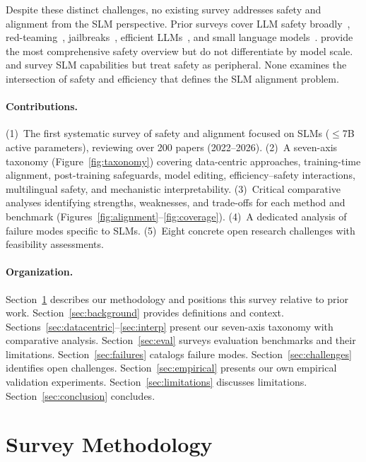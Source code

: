\documentclass[12pt,a4paper]{article}
\begin{document}
Despite these distinct challenges, no existing survey addresses safety and alignment from the SLM perspective. Prior surveys cover LLM safety broadly~\citep{li2024safetysurvey}, red-teaming~\citep{wang2024redteamsurvey}, jailbreaks~\citep{yi2024jailbreaksurvey}, efficient LLMs~\citep{wan2024efficient}, and small language models~\citep{wang2024slmsurvey,lu2024slm}. \citet{li2024safetysurvey} provide the most comprehensive safety overview but do not differentiate by model scale. \citet{wang2024slmsurvey} and \citet{lu2024slm} survey SLM capabilities but treat safety as peripheral. None examines the intersection of safety and efficiency that defines the SLM alignment problem.

\paragraph{Contributions.} (1)~The first systematic survey of safety and alignment focused on SLMs ($\leq$7B active parameters), reviewing over 200 papers (2022--2026). (2)~A seven-axis taxonomy (Figure~\ref{fig:taxonomy}) covering data-centric approaches, training-time alignment, post-training safeguards, model editing, efficiency--safety interactions, multilingual safety, and mechanistic interpretability. (3)~Critical comparative analyses identifying strengths, weaknesses, and trade-offs for each method and benchmark (Figures~\ref{fig:alignment}--\ref{fig:coverage}). (4)~A dedicated analysis of failure modes specific to SLMs. (5)~Eight concrete open research challenges with feasibility assessments.

\paragraph{Organization.} Section~\ref{sec:method} describes our methodology and positions this survey relative to prior work. Section~\ref{sec:background} provides definitions and context. Sections~\ref{sec:datacentric}--\ref{sec:interp} present our seven-axis taxonomy with comparative analysis. Section~\ref{sec:eval} surveys evaluation benchmarks and their limitations. Section~\ref{sec:failures} catalogs failure modes. Section~\ref{sec:challenges} identifies open challenges. Section~\ref{sec:empirical} presents our own empirical validation experiments. Section~\ref{sec:limitations} discusses limitations. Section~\ref{sec:conclusion} concludes.


\section{Survey Methodology}\label{sec:method}
\end{document}
